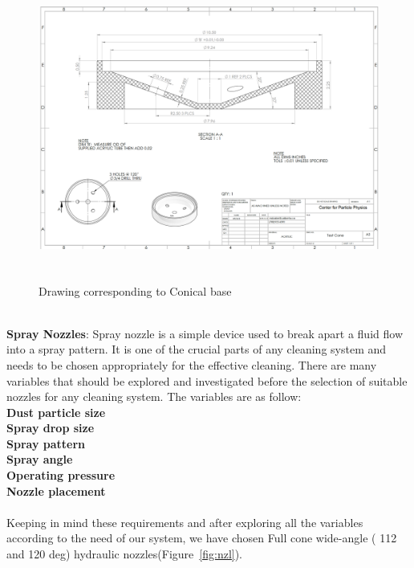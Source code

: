 \begin{figure}[!htpb]
  \centering
  \includegraphics[width = 12cm, height=10cm ]{figures/base}
  \caption{Drawing corresponding to Conical base}
  \label{fig:base}
\end{figure}
\\
\textbf{Spray Nozzles}:
Spray nozzle is a simple device used to break apart a fluid flow into a spray pattern. It is one of the crucial parts of any cleaning system and needs to be chosen appropriately for the effective cleaning. There are many variables that should be explored and investigated before the selection of suitable nozzles for any cleaning system. The variables are as follow:\\

\textbf{Dust particle size} \\                                              

\textbf{Spray drop size}\\

\textbf{Spray pattern}\\

\textbf{Spray angle}\\

\textbf{Operating pressure}\\

\textbf{Nozzle placement}\\
\\
Keeping in mind these requirements and after exploring all the variables according to the need of our system, we have chosen Full cone wide-angle ( 112 and 120 deg) hydraulic nozzles(Figure~\ref{fig:nzl}).\\

